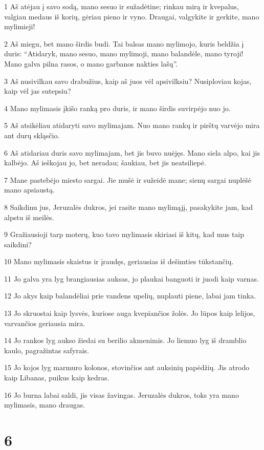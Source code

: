 \par 1 Aš atėjau į savo sodą, mano sesuo ir sužadėtine; rinkau mirą ir kvepalus, valgiau medaus iš korių, gėriau pieno ir vyno. Draugai, valgykite ir gerkite, mano mylimieji! 
\par 2 Aš miegu, bet mano širdis budi. Tai balsas mano mylimojo, kuris beldžia į duris: “Atidaryk, mano sesuo, mano mylimoji, mano balandėle, mano tyroji! Mano galva pilna rasos, o mano garbanos­ nakties lašų”. 
\par 3 Aš nusivilkau savo drabužius, kaip aš juos vėl apsivilksiu? Nusiploviau kojas, kaip vėl jas sutepsiu? 
\par 4 Mano mylimasis įkišo ranką pro duris, ir mano širdis suvirpėjo nuo jo. 
\par 5 Aš atsikėliau atidaryti savo mylimajam. Nuo mano rankų ir pirštų varvėjo mira ant durų skląsčio. 
\par 6 Aš atidariau duris savo mylimajam, bet jis buvo nuėjęs. Mano siela alpo, kai jis kalbėjo. Aš ieškojau jo, bet neradau; šaukiau, bet jis neatsiliepė. 
\par 7 Mane pastebėjo miesto sargai. Jie mušė ir sužeidė mane; sienų sargai nuplėšė mano apsiaustą. 
\par 8 Saikdinu jus, Jeruzalės dukros, jei rasite mano mylimąjį, pasakykite jam, kad alpstu iš meilės. 
\par 9 Gražiausioji tarp moterų, kuo tavo mylimasis skiriasi iš kitų, kad mus taip saikdini? 
\par 10 Mano mylimasis skaistus ir įraudęs, geriausias iš dešimties tūkstančių. 
\par 11 Jo galva yra lyg brangiausias auksas, jo plaukai banguoti ir juodi kaip varnas. 
\par 12 Jo akys kaip balandėliai prie vandens upelių, nuplauti piene, labai jam tinka. 
\par 13 Jo skruostai kaip lysvės, kuriose auga kvepiančios žolės. Jo lūpos kaip lelijos, varvančios geriausia mira. 
\par 14 Jo rankos lyg aukso žiedai su berilio akmenimis. Jo liemuo lyg iš dramblio kaulo, pagražintas safyrais. 
\par 15 Jo kojos lyg marmuro kolonos, stovinčios ant auksinių papėdžių. Jis atrodo kaip Libanas, puikus kaip kedras. 
\par 16 Jo burna labai saldi, jis visas žavingas. Jeruzalės dukros, toks yra mano mylimasis, mano draugas.



\chapter{6}



